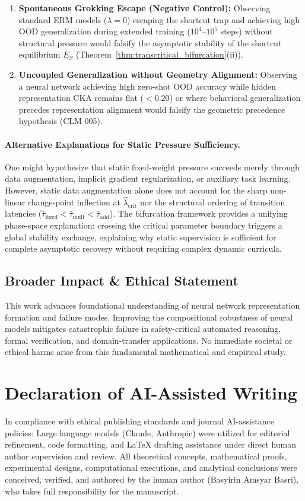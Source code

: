 \documentclass{article}
\theoremstyle{plain}
\theoremstyle{definition}
\begin{document}
\begin{enumerate}[leftmargin=*,noitemsep]
    \item \textbf{Spontaneous Grokking Escape (Negative Control):} Observing standard ERM models ($\lambda = 0$) escaping the shortcut trap and achieving high OOD generalization during extended training ($10^4$--$10^5$ steps) without structural pressure would falsify the asymptotic stability of the shortcut equilibrium $E_S$ (Theorem~\ref{thm:transcritical_bifurcation}(ii)).
    \item \textbf{Uncoupled Generalization without Geometry Alignment:} Observing a neural network achieving high zero-shot OOD accuracy while hidden representation CKA remains flat ($< 0.20$) or where behavioral generalization precedes representation alignment would falsify the geometric precedence hypothesis (CLM-005).
\end{enumerate}

\paragraph{Alternative Explanations for Static Pressure Sufficiency.}
One might hypothesize that static fixed-weight pressure succeeds merely through data augmentation, implicit gradient regularization, or auxiliary task learning. However, static data augmentation alone does not account for the sharp non-linear change-point inflection at $\hat{\lambda}_{\text{crit}}$ nor the structural ordering of transition latencies ($\hat{\tau}_{\text{fixed}} < \hat{\tau}_{\text{mult}} < \hat{\tau}_{\text{add}}$). The bifurcation framework provides a unifying phase-space explanation: crossing the critical parameter boundary triggers a global stability exchange, explaining why static supervision is sufficient for complete asymptotic recovery without requiring complex dynamic curricula.

\subsection{Broader Impact \& Ethical Statement}
This work advances foundational understanding of neural network representation formation and failure modes. Improving the compositional robustness of neural models mitigates catastrophic failure in safety-critical automated reasoning, formal verification, and domain-transfer applications. No immediate societal or ethical harms arise from this fundamental mathematical and empirical study.

\section*{Declaration of AI-Assisted Writing}
In compliance with ethical publishing standards and journal AI-assistance policies: Large language models (Claude, Anthropic) were utilized for editorial refinement, code formatting, and \LaTeX{} drafting assistance under direct human author supervision and review. All theoretical concepts, mathematical proofs, experimental designs, computational executions, and analytical conclusions were conceived, verified, and authored by the human author (Basyirin Amsyar Basri), who takes full responsibility for the manuscript.
\end{document}
